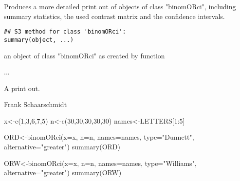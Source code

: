 \begin{Description}\relax
Produces a more detailed print out of objects of class "binomORci", including summary statistics,
the used contrast matrix and the confidence intervals.
\end{Description}
\begin{Usage}
\begin{verbatim}
## S3 method for class 'binomORci':
summary(object, ...)
\end{verbatim}
\end{Usage}
\begin{Arguments}
\begin{ldescription}
\item[\code{object}] an object of class "binomORci" as created by function  
\item[\code{...}] ... 
\end{ldescription}
\end{Arguments}
\begin{Value}
A print out.
\end{Value}
\begin{Author}\relax
Frank Schaarschmidt
\end{Author}
\begin{Examples}
\begin{ExampleCode}

x<-c(1,3,6,7,5)
n<-c(30,30,30,30,30)
names<-LETTERS[1:5]

ORD<-binomORci(x=x, n=n, names=names, type="Dunnett", alternative="greater")
summary(ORD)

ORW<-binomORci(x=x, n=n, names=names, type="Williams", alternative="greater")
summary(ORW)


\end{ExampleCode}
\end{Examples}

